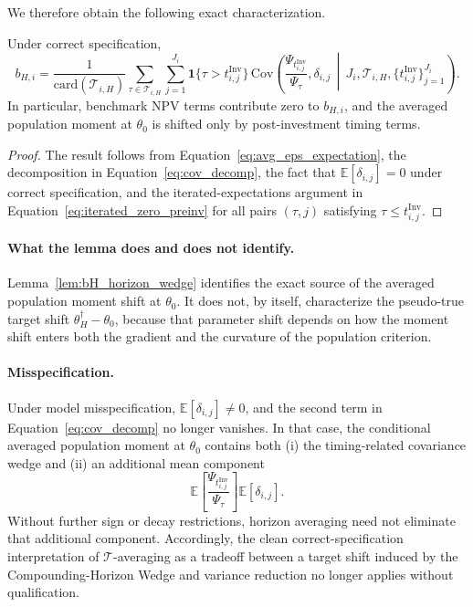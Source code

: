 We therefore obtain the following exact characterization.

\begin{lemma}
	\label{lem:bH_horizon_wedge}
	Under correct specification,
	\begin{equation}
		\label{eq:bH_horizon_wedge}
		b_{H,i}
		=
		\frac{1}{\mathrm{card}(\mathcal{T}_{i,H})}
		\sum_{\tau\in\mathcal{T}_{i,H}}
		\sum_{j=1}^{J_i}
		\mathbf{1}\{\tau>t_{i,j}^{\mathrm{Inv}}\}\,
		\mathrm{Cov}\!\left(
		\frac{\Psi_{t_{i,j}^{\mathrm{Inv}}}}{\Psi_\tau},
		\delta_{i,j}
		\,\middle|\,
		J_i,\mathcal{T}_{i,H},\{t_{i,j}^{\mathrm{Inv}}\}_{j=1}^{J_i}
		\right).
	\end{equation}
	In particular, benchmark NPV terms contribute zero to $b_{H,i}$, and the averaged population moment at $\theta_0$ is shifted only by post-investment timing terms.
\end{lemma}

\begin{proof}
	The result follows from Equation~\eqref{eq:avg_eps_expectation}, the decomposition in Equation~\eqref{eq:cov_decomp}, the fact that $\mathbb{E}[\delta_{i,j}]=0$ under correct specification, and the iterated-expectations argument in Equation~\eqref{eq:iterated_zero_preinv} for all pairs $(\tau,j)$ satisfying $\tau\le t_{i,j}^{\mathrm{Inv}}$.
\end{proof}

\paragraph{What the lemma does and does not identify.}
Lemma~\ref{lem:bH_horizon_wedge} identifies the exact source of the averaged population moment shift at $\theta_0$.
It does not, by itself, characterize the pseudo-true target shift $\theta_H^\dagger-\theta_0$, because that parameter shift depends on how the moment shift enters both the gradient and the curvature of the population criterion.

\paragraph{Misspecification.}
Under model misspecification, $\mathbb{E}[\delta_{i,j}]\neq 0$, and the second term in Equation~\eqref{eq:cov_decomp} no longer vanishes.
In that case, the conditional averaged population moment at $\theta_0$ contains both
(i) the timing-related covariance wedge and
(ii) an additional mean component
\[
\mathbb{E}\!\left[
\frac{\Psi_{t_{i,j}^{\mathrm{Inv}}}}{\Psi_\tau}
\right]
\mathbb{E}[\delta_{i,j}].
\]
Without further sign or decay restrictions, horizon averaging need not eliminate that additional component.
Accordingly, the clean correct-specification interpretation of $\mathcal{T}$-averaging as a tradeoff between a target shift induced by the Compounding-Horizon Wedge and variance reduction no longer applies without qualification.


